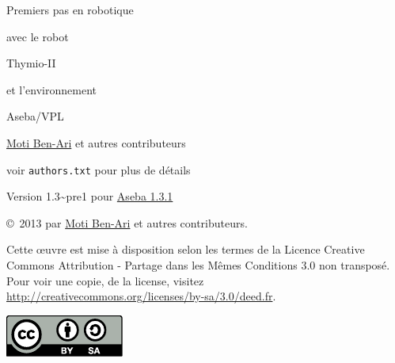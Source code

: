 \thispagestyle{empty}

\begin{center}
\begin{Huge}
\begin{bfseries}
Premiers pas en robotique
\end{bfseries}

avec le robot

\begin{bfseries}
Thymio-II
\end{bfseries}

et l'environnement

\begin{bfseries}
Aseba/VPL
\end{bfseries}

\end{Huge}

\vskip 2cm

\begin{LARGE}
\href{http://www.weizmann.ac.il/sci-tea/benari/}{Moti Ben-Ari} et autres contributeurs\\
\end{LARGE}
\bigskip
\begin{Large}
voir \texttt{authors.txt} pour plus de détails
\end{Large}

\vskip 1cm

\begin{Large}
Version 1.3{\textasciitilde}pre1 pour \href{https://aseba.wikidot.com/fr:downloadinstall}{Aseba 1.3.1}
\end{Large}

\end{center}

\vfill

\begin{center}
\copyright{}\  2013 par \href{http://www.weizmann.ac.il/sci-tea/benari/}{Moti Ben-Ari} et autres contributeurs.
\end{center}

Cette œuvre est mise à disposition selon les termes de la Licence Creative Commons Attribution - Partage dans les Mêmes Conditions 3.0 non transposé.
Pour voir une copie, de la license, visitez \url{http://creativecommons.org/licenses/by-sa/3.0/deed.fr}.

\begin{center}
\includegraphics[width=.2\textwidth]{../images/by-sa}
\end{center}
